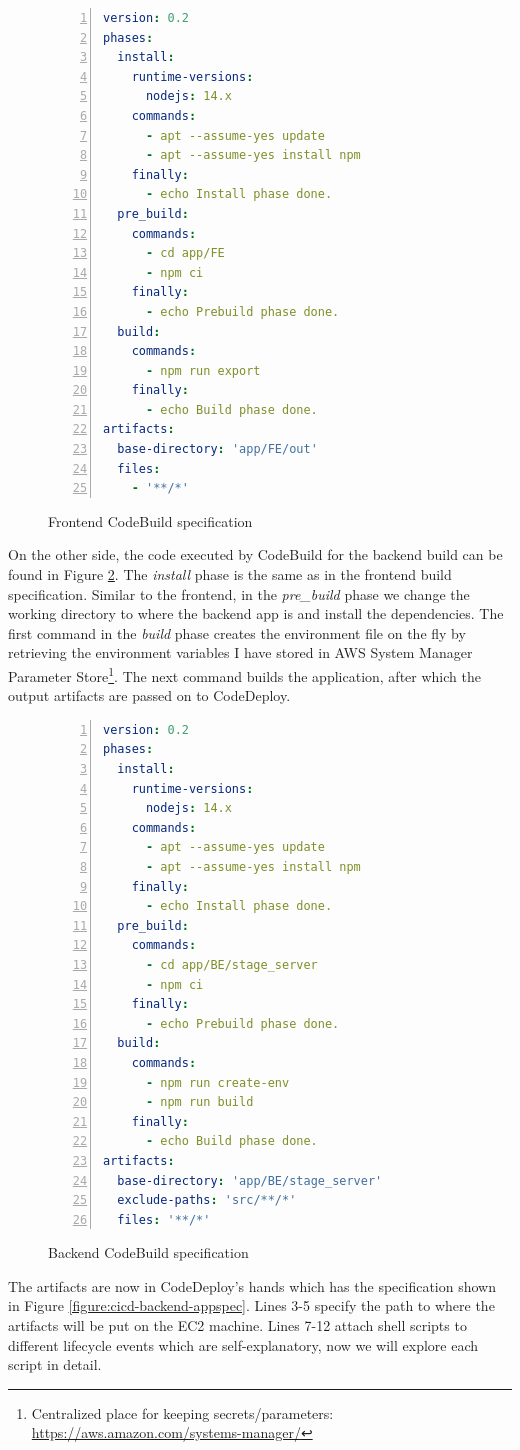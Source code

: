 \begin{figure}[H]
\begin{lstlisting}[numbers=left,language=yaml]
version: 0.2
phases:
  install:
    runtime-versions:
      nodejs: 14.x
    commands:
      - apt --assume-yes update
      - apt --assume-yes install npm
    finally:
      - echo Install phase done.
  pre_build:
    commands:
      - cd app/FE
      - npm ci
    finally:
      - echo Prebuild phase done.
  build:
    commands:
      - npm run export
    finally:
      - echo Build phase done.
artifacts:
  base-directory: 'app/FE/out'
  files:
    - '**/*'
\end{lstlisting}
\caption{Frontend CodeBuild specification}
\label{figure:cicd-frontend-buildspec}
\end{figure}

On the other side, the code executed by CodeBuild for the backend build can be found in Figure \ref{figure:cicd-backend-buildspec}. The \textit{install} phase is the same as in the frontend build specification. Similar to the frontend, in the \textit{pre\_build} phase we change the working directory to where the backend app is and install the dependencies. The first command in the \textit{build} phase creates the environment file on the fly by retrieving the environment variables I have stored in AWS System Manager Parameter Store\footnote{Centralized place for keeping secrets/parameters: \href{https://aws.amazon.com/systems-manager/}{https://aws.amazon.com/systems-manager/}}. The next command builds the application, after which the output artifacts are passed on to CodeDeploy.

\begin{figure}[H]
\begin{lstlisting}[numbers=left,language=yaml]
version: 0.2
phases:
  install:
    runtime-versions:
      nodejs: 14.x
    commands:
      - apt --assume-yes update
      - apt --assume-yes install npm
    finally:
      - echo Install phase done.
  pre_build:
    commands:
      - cd app/BE/stage_server
      - npm ci
    finally:
      - echo Prebuild phase done.
  build:
    commands:
      - npm run create-env
      - npm run build
    finally:
      - echo Build phase done.
artifacts:
  base-directory: 'app/BE/stage_server'
  exclude-paths: 'src/**/*'
  files: '**/*'
\end{lstlisting}
\caption{Backend CodeBuild specification}
\label{figure:cicd-backend-buildspec}
\end{figure}

The artifacts are now in CodeDeploy's hands which has the specification shown in Figure \ref{figure:cicd-backend-appspec}. Lines 3-5 specify the path to where the artifacts will be put on the EC2 machine. Lines 7-12 attach shell scripts to different lifecycle events which are self-explanatory, now we will explore each script in detail.

